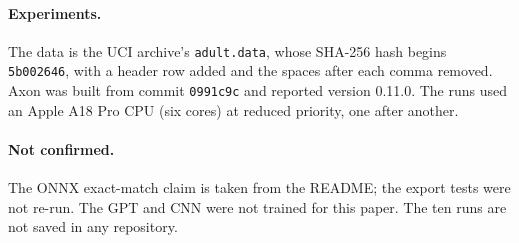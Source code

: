 \documentclass[11pt]{article}
\theoremstyle{plain}
\theoremstyle{definition}
\newcommand{\code}[1]{\texttt{#1}}
\begin{document}
\paragraph{Experiments.} The data is the UCI archive's \code{adult.data},
whose SHA-256 hash begins \code{5b002646}, with a header row added and the
spaces after each comma removed. Axon was built from commit \code{0991c9c}
and reported version 0.11.0. The runs used an Apple A18 Pro CPU (six cores) at
reduced priority, one after another.

\paragraph{Not confirmed.} The ONNX exact-match claim is taken from the
README; the export tests were not re-run. The GPT and CNN were not trained for
this paper. The ten runs are not saved in any repository.
\end{document}
